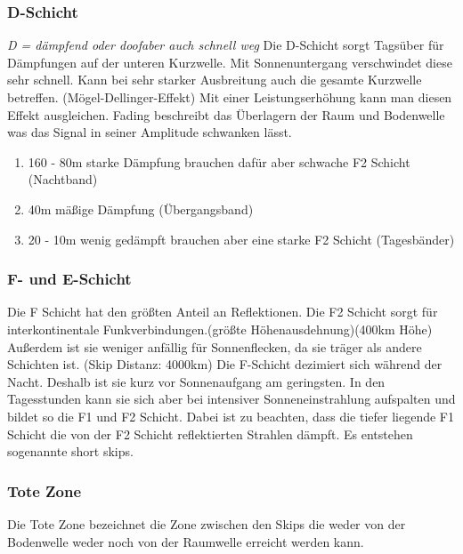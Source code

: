\documentclass[fontzize=12pt,paper=a4,twoside=false]{article}
\begin{document}
            \subsubsection[]{D-Schicht}
            {\it D = dämpfend oder doof\newline aber auch schnell weg } \newline
            Die D-Schicht sorgt Tagsüber für Dämpfungen auf der unteren Kurzwelle. Mit Sonnenuntergang verschwindet diese sehr schnell. Kann bei sehr starker Ausbreitung auch die gesamte Kurzwelle betreffen. 
            (Mögel-Dellinger-Effekt) Mit einer Leistungserhöhung kann man diesen Effekt ausgleichen.
            Fading beschreibt das Überlagern der Raum und Bodenwelle was das Signal in seiner Amplitude schwanken lässt.
            \begin{enumerate}
                \item 160 - 80m starke Dämpfung brauchen dafür aber schwache F2 Schicht (Nachtband)
                \item 40m mäßige Dämpfung (Übergangsband)
                \item 20 - 10m wenig gedämpft brauchen aber eine starke F2 Schicht (Tagesbänder)
            \end{enumerate}
            \subsubsection[]{F- und E-Schicht}
            Die F Schicht hat den größten Anteil an Reflektionen. \newline
            Die F2 Schicht sorgt für interkontinentale Funkverbindungen.(größte Höhenausdehnung)(400km Höhe) Außerdem ist sie weniger anfällig für Sonnenflecken, da sie träger als andere Schichten ist. (Skip Distanz: 4000km)
            \newline 
            Die F-Schicht dezimiert sich während der Nacht. Deshalb ist sie kurz vor Sonnenaufgang am geringsten. In den Tagesstunden kann sie sich aber bei intensiver Sonneneinstrahlung aufspalten und bildet so die F1 und F2 Schicht.
            Dabei ist zu beachten, dass die tiefer liegende F1 Schicht die von der F2 Schicht reflektierten Strahlen dämpft. Es entstehen sogenannte \dq short skips\dq.

    \subsubsection[]{Tote Zone}
        Die Tote Zone bezeichnet die Zone zwischen den Skips die weder von der Bodenwelle weder noch von der Raumwelle erreicht werden kann.
\end{document}
